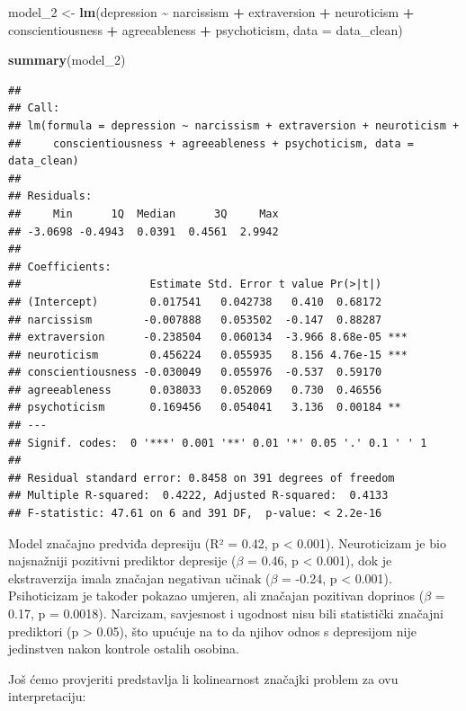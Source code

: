 \documentclass[
]{article}
\newenvironment{Shaded}{\begin{snugshade}}{\end{snugshade}}
\newcommand{\AttributeTok}[1]{\textcolor[rgb]{0.13,0.29,0.53}{#1}}
\newcommand{\FunctionTok}[1]{\textcolor[rgb]{0.13,0.29,0.53}{\textbf{#1}}}
\newcommand{\NormalTok}[1]{#1}
\newcommand{\OtherTok}[1]{\textcolor[rgb]{0.56,0.35,0.01}{#1}}
\newcommand{\SpecialCharTok}[1]{\textcolor[rgb]{0.81,0.36,0.00}{\textbf{#1}}}
\begin{document}
\begin{Shaded}
\begin{Highlighting}[]
\NormalTok{model\_2 }\OtherTok{\textless{}{-}} \FunctionTok{lm}\NormalTok{(depression }\SpecialCharTok{\textasciitilde{}}\NormalTok{ narcissism }\SpecialCharTok{+}\NormalTok{ extraversion }\SpecialCharTok{+}\NormalTok{ neuroticism }\SpecialCharTok{+}\NormalTok{ conscientiousness }\SpecialCharTok{+}\NormalTok{ agreeableness }\SpecialCharTok{+}\NormalTok{ psychoticism,}
             \AttributeTok{data =}\NormalTok{ data\_clean)}

\FunctionTok{summary}\NormalTok{(model\_2)}
\end{Highlighting}
\end{Shaded}

\begin{verbatim}
## 
## Call:
## lm(formula = depression ~ narcissism + extraversion + neuroticism + 
##     conscientiousness + agreeableness + psychoticism, data = data_clean)
## 
## Residuals:
##     Min      1Q  Median      3Q     Max 
## -3.0698 -0.4943  0.0391  0.4561  2.9942 
## 
## Coefficients:
##                    Estimate Std. Error t value Pr(>|t|)    
## (Intercept)        0.017541   0.042738   0.410  0.68172    
## narcissism        -0.007888   0.053502  -0.147  0.88287    
## extraversion      -0.238504   0.060134  -3.966 8.68e-05 ***
## neuroticism        0.456224   0.055935   8.156 4.76e-15 ***
## conscientiousness -0.030049   0.055976  -0.537  0.59170    
## agreeableness      0.038033   0.052069   0.730  0.46556    
## psychoticism       0.169456   0.054041   3.136  0.00184 ** 
## ---
## Signif. codes:  0 '***' 0.001 '**' 0.01 '*' 0.05 '.' 0.1 ' ' 1
## 
## Residual standard error: 0.8458 on 391 degrees of freedom
## Multiple R-squared:  0.4222, Adjusted R-squared:  0.4133 
## F-statistic: 47.61 on 6 and 391 DF,  p-value: < 2.2e-16
\end{verbatim}

Model značajno predviđa depresiju (R² = 0.42, p \textless{} 0.001).
Neuroticizam je bio najsnažniji pozitivni prediktor depresije (\(\beta\)
= 0.46, p \textless{} 0.001), dok je ekstraverzija imala značajan
negativan učinak (\(\beta\) = -0.24, p \textless{} 0.001). Psihoticizam
je također pokazao umjeren, ali značajan pozitivan doprinos (\(\beta\) =
0.17, p = 0.0018). Narcizam, savjesnost i ugodnost nisu bili statistički
značajni prediktori (p \textgreater{} 0.05), što upućuje na to da njihov
odnos s depresijom nije jedinstven nakon kontrole ostalih osobina.

Još ćemo provjeriti predstavlja li kolinearnost značajki problem za ovu
interpretaciju:
\end{document}
